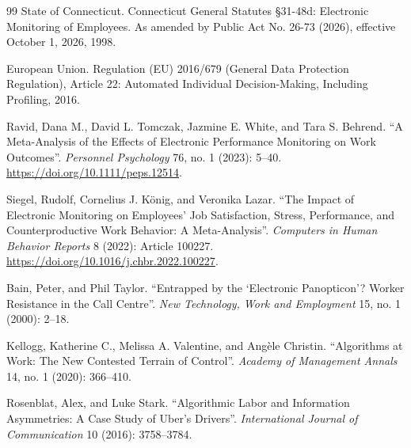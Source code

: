 \documentclass[10pt]{article}
\begin{document}
\begin{thebibliography}{99}
 State of Connecticut. Connecticut General Statutes \S 31-48d: Electronic Monitoring of Employees. As amended by Public Act No. 26-73 (2026), effective October 1, 2026, 1998.

 European Union. Regulation (EU) 2016/679 (General Data Protection Regulation), Article 22: Automated Individual Decision-Making, Including Profiling, 2016.

 Ravid, Dana M., David L. Tomczak, Jazmine E. White, and Tara S. Behrend. ``A Meta-Analysis of the Effects of Electronic Performance Monitoring on Work Outcomes''. \emph{Personnel Psychology} 76, no. 1 (2023): 5--40. \url{https://doi.org/10.1111/peps.12514}.

 Siegel, Rudolf, Cornelius J. K\"onig, and Veronika Lazar. ``The Impact of Electronic Monitoring on Employees' Job Satisfaction, Stress, Performance, and Counterproductive Work Behavior: A Meta-Analysis''. \emph{Computers in Human Behavior Reports} 8 (2022): Article 100227. \url{https://doi.org/10.1016/j.chbr.2022.100227}.

 Bain, Peter, and Phil Taylor. ``Entrapped by the `Electronic Panopticon'? Worker Resistance in the Call Centre''. \emph{New Technology, Work and Employment} 15, no. 1 (2000): 2--18.

 Kellogg, Katherine C., Melissa A. Valentine, and Ang\`ele Christin. ``Algorithms at Work: The New Contested Terrain of Control''. \emph{Academy of Management Annals} 14, no. 1 (2020): 366--410.

 Rosenblat, Alex, and Luke Stark. ``Algorithmic Labor and Information Asymmetries: A Case Study of Uber's Drivers''. \emph{International Journal of Communication} 10 (2016): 3758--3784.

\end{thebibliography}
\end{document}

